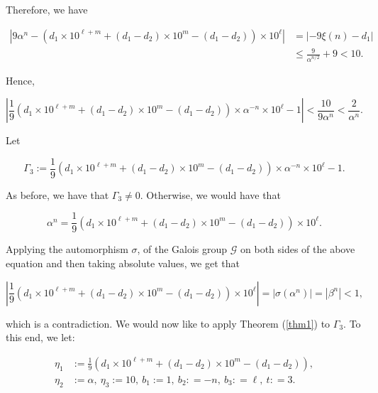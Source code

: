 \documentclass[10pt,a4paper]{article}
\begin{document}
\noindent Therefore, we have

\begin{align*}
\left| 9\alpha^n - \left(d_1 \times 10^{\ell+m} + (d_1-d_2)\times 10^m - (d_1-d_2)\right)\times 10^\ell  \right| & = |-9\xi(n) - d_1|\\
& \leq \frac{9}{\alpha^{n/2}} + 9 < 10.
\end{align*}

\noindent Hence,

\begin{equation}\label{eq8}
\left| \frac{1}{9} \left(d_1 \times 10^{\ell+m} + (d_1-d_2)\times 10^m - (d_1-d_2)\right)\times \alpha^{-n} \times 10^\ell - 1 \right| < \frac{10}{9 \alpha^n} < \frac{2}{\alpha^n}.
\end{equation}

\noindent Let

\begin{equation*}
\Gamma_3 :=  \frac{1}{9}\left (d_1 \times 10^{\ell+m} + (d_1-d_2)\times 10^m - (d_1-d_2)\right)  \times \alpha^{-n} \times 10^\ell - 1.
\end{equation*}

\noindent As before, we have that $\Gamma_3 \ne 0$. Otherwise, we would have that

\begin{equation*}
 \alpha^n = \frac{1}{9} \left(d_1 \times 10^{\ell+m} + (d_1-d_2)\times 10^m - (d_1-d_2)\right) \times 10^\ell.
\end{equation*}

\noindent Applying the automorphism $\sigma$, of the Galois group $\mathcal{G}$ on both sides of the above equation and then taking absolute values, we get that

\begin{equation*}
\left| \frac{1}{9} \left(d_1 \times 10^{\ell+m} + (d_1-d_2)\times 10^m - (d_1-d_2)\right) \times 10^\ell \right| = |\sigma ( \alpha^n)| = | \beta^n| < 1,
\end{equation*}

\noindent which is a contradiction. We would now like to apply Theorem (\ref{thm1}) to $\Gamma_3$. To this end, we let:

\begin{align*}
\eta_1 &:=   \frac{1}{9}\left( d_1 \times 10^{\ell+m} + (d_1-d_2)\times 10^m - (d_1-d_2) \right), \\ \eta_2 & := \alpha, \ \eta_3 := 10, \ b_1 := 1, \ b_2: = -n, \ b_3: = \ell, \ t: = 3.
\end{align*}
\end{document}
